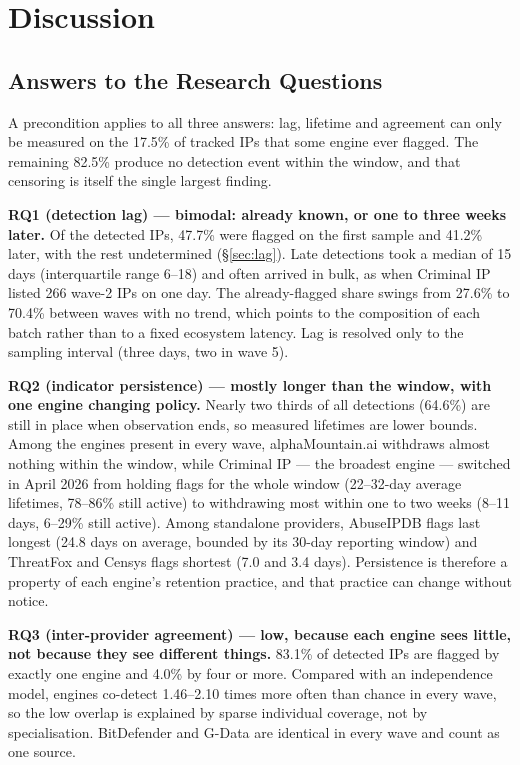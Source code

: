 \chapter{Discussion}
\label{ch:discussion}

\section{Answers to the Research Questions}
\label{sec:rq_answers}

A precondition applies to all three answers: lag, lifetime and agreement can only be measured on the
17.5\% of tracked IPs that some engine ever flagged. The remaining 82.5\% produce no detection event
within the window, and that censoring is itself the single largest finding.

\textbf{RQ1 (detection lag) --- bimodal: already known, or one to three weeks later.} Of the
detected IPs, 47.7\% were flagged on the first sample and 41.2\% later, with the rest undetermined
(\S\ref{sec:lag}). Late detections took a median of 15 days (interquartile range 6--18) and often
arrived in bulk, as when Criminal IP listed 266 wave-2 IPs on one day. The already-flagged share
swings from 27.6\% to 70.4\% between waves with no trend, which points to the composition of each
batch rather than to a fixed ecosystem latency. Lag is resolved only to the sampling interval
(three days, two in wave 5).

\textbf{RQ2 (indicator persistence) --- mostly longer than the window, with one engine changing
policy.} Nearly two thirds of all detections (64.6\%) are still in place when observation ends, so
measured lifetimes are lower bounds. Among the engines present in every wave, alphaMountain.ai
withdraws almost nothing within the window, while Criminal IP --- the broadest engine --- switched in
April 2026 from holding flags for the whole window (22--32-day average lifetimes, 78--86\% still
active) to withdrawing most within one to two weeks (8--11 days, 6--29\% still active). Among
standalone providers, AbuseIPDB flags last longest (24.8 days on average, bounded by its 30-day
reporting window) and ThreatFox and Censys flags shortest (7.0 and 3.4 days). Persistence is
therefore a property of each engine's retention practice, and that practice can change without
notice.

\textbf{RQ3 (inter-provider agreement) --- low, because each engine sees little, not because they
see different things.} 83.1\% of detected IPs are flagged by exactly one engine and 4.0\% by four or
more. Compared with an independence model, engines co-detect 1.46--2.10 times more often than
chance in every wave, so the low overlap is explained by sparse individual coverage, not by
specialisation. BitDefender and G-Data are identical in every wave and count as one source.

